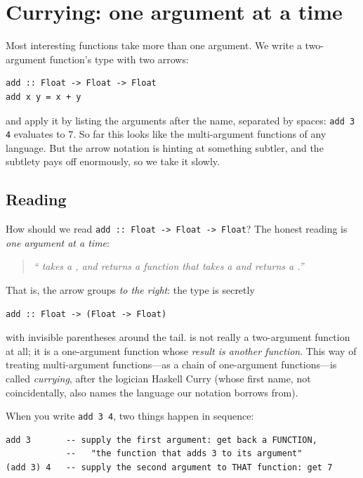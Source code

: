 \section{Currying: one argument at a time}
\label{sec:currying}

Most interesting functions take more than one argument. We write a two-argument
function's type with two arrows:

\begin{lstlisting}[style=l4style]
add :: Float -> Float -> Float
add x y = x + y
\end{lstlisting}

\noindent and apply it by listing the arguments after the name, separated by
spaces: \lstinline[style=l4style]|add 3 4| evaluates to $7$. So far this looks
like the multi-argument functions of any language. But the arrow notation is
hinting at something subtler, and the subtlety pays off enormously, so we take it
slowly.

\subsection{Reading }

How should we read \lstinline[style=l4style]|add :: Float -> Float -> Float|? The
honest reading is \emph{one argument at a time}:

\begin{quote}
\emph{`` takes a , and returns a function that takes a
 and returns a .''}
\end{quote}

\noindent That is, the arrow \code{->} groups \emph{to the right}: the type is
secretly
\begin{lstlisting}[style=l4style]
add :: Float -> (Float -> Float)
\end{lstlisting}
\noindent with invisible parentheses around the tail.  is not really a
two-argument function at all; it is a one-argument function whose \emph{result is
another function}. This way of treating multi-argument functions---as a chain of
one-argument functions---is called \emph{currying}, after the logician Haskell
Curry (whose first name, not coincidentally, also names the language our notation
borrows from).

When you write \lstinline[style=l4style]|add 3 4|, two things happen in
sequence:

\begin{lstlisting}[style=l4style]
add 3       -- supply the first argument: get back a FUNCTION,
            --   "the function that adds 3 to its argument"
(add 3) 4   -- supply the second argument to THAT function: get 7
\end{lstlisting}

